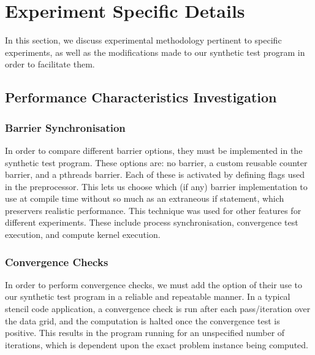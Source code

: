 \section{Experiment Specific Details}
\label{section:experimental_methodology:experiment_specific_details}

In this section, we discuss experimental methodology pertinent to specific experiments, as well as the modifications made to our synthetic test program in order to facilitate them.



\subsection{Performance Characteristics Investigation}
\label{section:experimental_methodology:performance_characteristics_investigation}

\subsubsection{Barrier Synchronisation}
\label{section:experimental_methodology:barrier_syncronisation}

In order to compare different barrier options, they must be implemented in the synthetic test program. These options are: no barrier, a custom reusable counter barrier, and a pthreads barrier. Each of these is activated by defining flags used in the preprocessor. This lets us choose which (if any) barrier implementation to use at compile time without so much as an extraneous if statement, which preservers realistic performance. This technique was used for other features for different experiments. These include process synchronisation, convergence test execution, and compute kernel execution.



\subsubsection{Convergence Checks}
\label{section:experimental_methodology:convergence_checks}

In order to perform convergence checks, we must add the option of their use to our synthetic test program in a reliable and repeatable manner. In a typical stencil code application, a convergence check is run after each pass/iteration over the data grid, and the computation is halted once the convergence test is positive. This results in the program running for an unspecified number of iterations, which is dependent upon the exact problem instance being computed.

